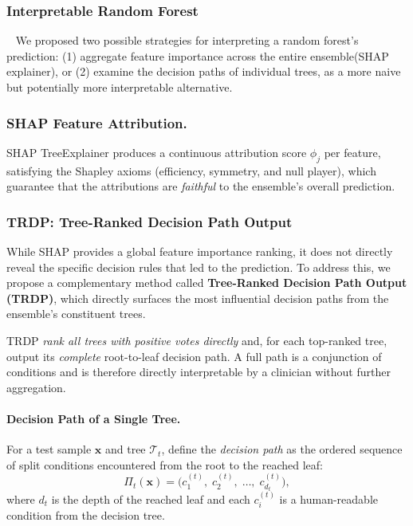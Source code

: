\documentclass[letterpaper]{article} %
\begin{document}
\subsubsection{Interpretable Random Forest}
\
\newline
We proposed two possible strategies for interpreting a random forest's prediction: (1) aggregate feature importance across the entire ensemble(SHAP explainer), or (2) examine the decision paths of individual trees, as a more naive but potentially more interpretable alternative.

\subsubsection{SHAP Feature Attribution.}
SHAP TreeExplainer \cite{Lundberg2020} produces a continuous attribution score $\phi_j$ per feature, satisfying the Shapley axioms (efficiency, symmetry, and null player), which guarantee that the attributions are \emph{faithful} to the ensemble's overall prediction.

\subsubsection{TRDP: Tree-Ranked Decision Path Output}
While SHAP provides a global feature importance ranking, it does not directly reveal the specific decision rules that led to the prediction. To address this, we propose a complementary method called \textbf{Tree-Ranked Decision Path Output (TRDP)}, which directly surfaces the most influential decision paths from the ensemble's constituent trees.

TRDP \emph{rank all trees with positive votes directly} and, for each top-ranked tree, output its \emph{complete} root-to-leaf decision path.  A full path is a conjunction of conditions and is therefore directly interpretable by a clinician without further aggregation.
 
\paragraph{Decision Path of a Single Tree.}
For a test sample $\mathbf{x}$ and tree $\mathcal{T}_t$, define the
\emph{decision path} as the ordered sequence of split conditions
encountered from the root to the reached leaf:
\begin{equation}
    \Pi_t(\mathbf{x}) =
    \bigl(c_1^{(t)},\; c_2^{(t)},\; \ldots,\; c_{d_t}^{(t)}\bigr),
    \label{eq:path}
\end{equation}
where $d_t$ is the depth of the reached leaf and each $c_i^{(t)}$ is a human-readable condition from the decision tree.
\end{document}
